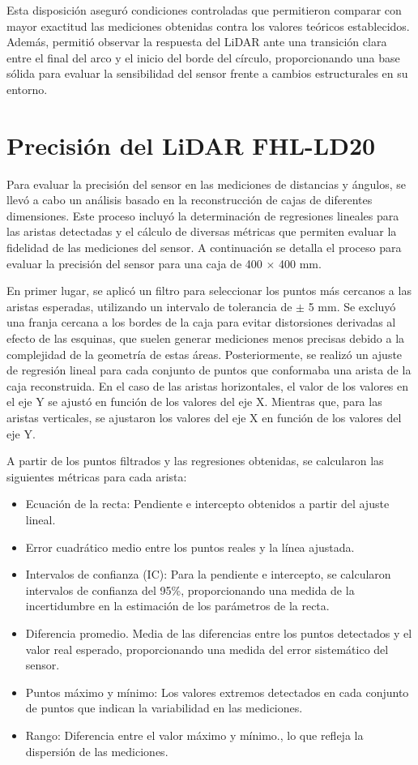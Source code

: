 Esta disposición aseguró condiciones controladas que permitieron comparar con mayor exactitud las mediciones obtenidas contra los valores teóricos establecidos. Además, permitió observar la respuesta del LiDAR ante una transición clara entre el final del arco y el inicio del borde del círculo, proporcionando una base sólida para evaluar la sensibilidad del sensor frente a cambios estructurales en su entorno.





\section{Precisión del LiDAR FHL-LD20}
Para evaluar la precisión del sensor en las mediciones de distancias y ángulos, se llevó a cabo un análisis basado en la reconstrucción de cajas de diferentes dimensiones. Este proceso incluyó la determinación de regresiones lineales para las aristas detectadas y el cálculo de diversas métricas que permiten evaluar la fidelidad de las mediciones del sensor. A continuación se detalla el proceso para evaluar la precisión del sensor para una caja de 400 $\times$ 400 mm.

En primer lugar, se aplicó un filtro para seleccionar los puntos más cercanos a las aristas esperadas, utilizando un intervalo de tolerancia de $\pm$ 5 mm. Se excluyó una franja cercana a los bordes de la caja para evitar distorsiones derivadas al efecto de las esquinas, que suelen generar mediciones menos precisas debido a la complejidad de la geometría de estas áreas. Posteriormente, se realizó un ajuste de regresión lineal para cada conjunto de puntos que conformaba una arista de la caja reconstruida. En el caso de las aristas horizontales, el valor de los valores en el eje Y se ajustó en función de los valores del eje X. Mientras que, para las aristas verticales, se ajustaron los valores del eje X en función de los valores del eje Y. 

A partir de los puntos filtrados y las regresiones obtenidas, se calcularon las siguientes métricas para cada arista:
\begin{itemize}
	\item Ecuación de la recta: Pendiente e intercepto obtenidos a partir del ajuste lineal.
	\item Error cuadrático medio entre los puntos reales y la línea ajustada.
	\item Intervalos de confianza (IC): Para la pendiente e intercepto, se calcularon intervalos de confianza del 95\%, proporcionando una medida de la incertidumbre en la estimación de los parámetros de la recta.
	\item Diferencia promedio. Media de las diferencias entre los puntos detectados y el valor real esperado, proporcionando una medida del error sistemático del sensor.
	\item Puntos máximo y mínimo: Los valores extremos detectados en cada conjunto de puntos que indican la variabilidad en las mediciones.
	\item Rango: Diferencia entre el valor máximo y mínimo., lo que refleja la dispersión de las mediciones.
\end{itemize}

